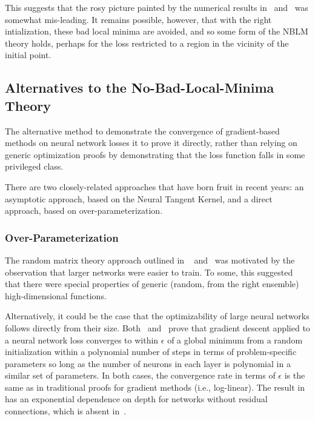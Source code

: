 \documentclass[../../thesis.tex]{subfiles}
\begin{document}
This suggests that the rosy picture painted by the numerical results
in~\cite{dauphin2014} and~\cite{pennington2017}
was somewhat mis-leading.
It remains possible, however,
that with the right intialization,
these bad local minima
are avoided,
and so some form of the NBLM theory holds,
perhaps for the loss restricted to a region in the vicinity
of the initial point.

\subsection{Alternatives to the No-Bad-Local-Minima Theory}

The alternative method to
demonstrate the convergence of gradient-based methods
on neural network losses it to prove it directly,
rather than relying on generic optimization proofs
by demonstrating that the loss function falls in some
privileged class.

There are two closely-related approaches
that have born fruit in recent years:
an asymptotic approach, based on the Neural Tangent Kernel,
and a direct approach, based on over-parameterization.

\subsubsection{Over-Parameterization}

The random matrix theory approach outlined in%
~ and~
was motivated by the observation that larger networks
were easier to train.
To some, this suggested that there were special properties
of generic (random, from the right ensemble) high-dimensional functions.

Alternatively, it could be the case that the optimizability
of large neural networks follows directly from their size.
Both~\cite{allenzhu2018} and~\cite{du2018}
prove that gradient descent applied to a neural network loss
converges to within $\epsilon$ of a global minimum from a random initialization
within a polynomial number of steps in terms of
problem-specific parameters so long as the number of
neurons in each layer is polynomial in a similar set of parameters.
In both cases, the convergence rate in terms of $\epsilon$
is the same as in traditional proofs for gradient methods
(i.e., log-linear).
The result in~\cite{du2018} has an exponential dependence on depth for networks
without residual connections,
which is absent in~\cite{allenzhu2018}.
\end{document}
